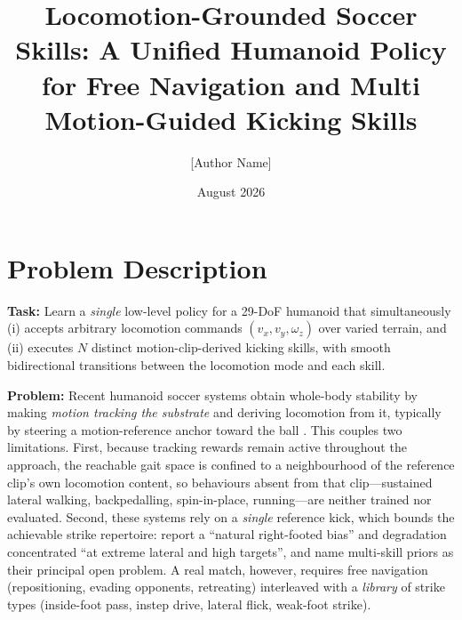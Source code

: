 \documentclass{article}
\begin{document}
\title{Locomotion-Grounded Soccer Skills: A Unified Humanoid Policy for Free Navigation and Multi Motion-Guided Kicking Skills}
\author{[Author Name]}
\date{August 2026}
\maketitle

\section{Problem Description}

\textbf{Task:} Learn a \emph{single} low-level policy for a 29-DoF humanoid that simultaneously (i) accepts arbitrary locomotion commands $(v_x, v_y, \omega_z)$ over varied terrain, and (ii) executes $N$ distinct motion-clip-derived kicking skills, with smooth bidirectional transitions between the locomotion mode and each skill.

\textbf{Problem:} Recent humanoid soccer systems obtain whole-body stability by making \emph{motion tracking the substrate} and deriving locomotion from it, typically by steering a motion-reference anchor toward the ball \citep{robonaldo,paid,humanx}. This couples two limitations. First, because tracking rewards remain active throughout the approach, the reachable gait space is confined to a neighbourhood of the reference clip's own locomotion content, so behaviours absent from that clip---sustained lateral walking, backpedalling, spin-in-place, running---are neither trained nor evaluated. Second, these systems rely on a \emph{single} reference kick, which bounds the achievable strike repertoire: \citet{robonaldo} report a ``natural right-footed bias'' and degradation concentrated ``at extreme lateral and high targets'', and name multi-skill priors as their principal open problem. A real match, however, requires free navigation (repositioning, evading opponents, retreating) interleaved with a \emph{library} of strike types (inside-foot pass, instep drive, lateral flick, weak-foot strike).
\end{document}
